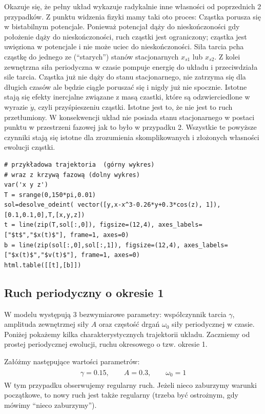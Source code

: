 \documentclass[a4paper,12pt,polish]{sphinxmanual}
\begin{document}
Okazuje się, że pełny układ wykazuje radykalnie inne własności od poprzednich 2 przypadków. Z punktu widzenia fizyki mamy taki oto proces:  Cząstka porusza się w bistabilnym potencjale. Ponieważ potencjał dąży do nieskończoności gdy położenie dąży do nieskończoności, ruch cząstki jest ograniczony; cząstka jest uwięziona w potencjale i nie może uciec do nieskończoności. Siła tarcia pcha cząstkę do jednego ze (``starych'') stanów stacjonarnych  $x_{s1}$  lub $x_{s2}$. Z kolei zewnętrzna siła periodyczna w czasie pompuje energię do układu i przeciwdziała sile tarcia. Cząstka już nie dąży do stanu stacjonarnego, nie zatrzyma się dla długich czasów ale będzie  ciągle poruszać się i nigdy już nie spocznie. Istotne stają się efekty inercjalne związane z masą czastki, które są odzwierciedlone w wyrazie $\dot y$, czyli przyśpieszeniu cząstki. Istotne jest to, że nie jest to ruch przetłumiony. W konsekwencji układ nie posiada stanu stacjonarnego w postaci punktu w przestrzeni fazowej jak to było w przypadku 2. Wszystkie te powyższe czynniki stają się istotne dla zrozumienia  skomplikowanych i złożonych własności ewolucji cząstki.


\begin{verbatim}
# przykładowa trajektoria  (górny wykres)
# wraz z krzywą fazową (dolny wykres)
var('x y z')
T = srange(0,150*pi,0.01)
sol=desolve_odeint( vector([y,x-x^3-0.26*y+0.3*cos(z), 1]), [0.1,0.1,0],T,[x,y,z])
t = line(zip(T,sol[:,0]), figsize=(12,4), axes_labels=["$t$","$x(t)$"], frame=1, axes=0)
b = line(zip(sol[:,0],sol[:,1]), figsize=(12,4), axes_labels=["$x(t)$","$v(t)$"], frame=1, axes=0)
html.table([[t],[b]])
\end{verbatim}



\subsection{Ruch periodyczny o okresie 1}
\label{ch2/chII011:ruch-periodyczny-o-okresie-1}
W modelu występują 3 bezwymiarowe parametry: współczynnik tarcia $\gamma$, amplituda zewnętrznej siły $A$ oraz częstość drgań $\omega_0$ siły periodycznej w czasie. Poniżej pokażemy kilka charakterystycznych trajektorii układu. Zaczniemy od prostej periodycznej ewolucji, ruchu okresowego o tzw. okresie 1.

Załóżmy następujące wartości parametrów:
\label{ch2/chII011:equation-eqn19}\begin{gather}
\begin{split}\gamma = 0.15, \qquad A = 0.3, \qquad \omega_0 = 1\end{split}\label{ch2/chII011-eqn19}
\end{gather}
W tym przypadku obserwujemy regularny ruch. Jeżeli nieco zaburzymy warunki początkowe, to nowy ruch jest także regularny (trzeba być ostrożnym, gdy mówimy ``nieco zaburzymy'').
\end{document}
